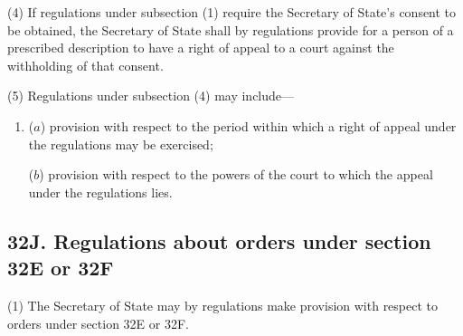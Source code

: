 \documentclass[a4paper]{article}
\begin{document}
(4) If regulations under subsection (1) require the Secretary of State’s consent to
be obtained, the Secretary of State shall by regulations provide for a person of a
prescribed description to have a right of appeal to a court against the withholding of
that consent.

(5) Regulations under subsection (4) may include---
\begin{enumerate}\item[]
($a$) provision with respect to the period within which a right of appeal under the
regulations may be exercised;

($b$) provision with respect to the powers of the court to which the appeal under
the regulations lies.
\end{enumerate}


\subsection{32J. Regulations about orders under section 32E or 32F}

(1) The Secretary of State may by regulations make provision with respect to orders under section 32E or 32F.
\end{document}
